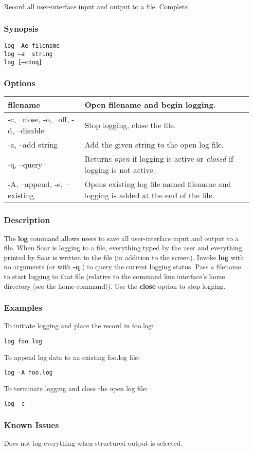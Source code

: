 \subsection{}
\label{log}
Record all user-interface input and output to a file. 
 Complete
\subsubsection*{Synopsis}
\begin{verbatim}
log –Ae filename
log –a  string
log [–cdoq]
\end{verbatim}
\subsubsection*{Options}
\begin{tabular}{|l|l|}
\hline 
 filename  & Open filename and begin logging.  \\
 \hline 
 -c, --close, -o, --off, -d, --disable  & Stop logging, close the file.  \\
 \hline 
 -a, --add string  & Add the given string to the open log file.  \\
 \hline 
 -q, --query  & Returns \emph{open}
 if logging is active or \emph{closed}
 if logging is not active.  \\
 \hline 
 -A, --append, -e, --existing  & Opens existing log file named filename and logging is added at the end of the file.  \\
 \hline 
\end{tabular}
\subsubsection*{Description}
 The \textbf{log}
 command allows users to save all user-interface input and output to a file. When Soar is logging to a file, everything typed by the user and everything printed by Soar is written to the file (in addition to the screen). 
 Invoke \textbf{log}
 with no arguments (or with \textbf{-q}
) to query the current logging status. Pass a filename to start logging to that file (relative to the command line interface's home directory (see the home command)). Use the \textbf{close}
 option to stop logging. 
\subsubsection*{Examples}
 To initiate logging and place the record in foo.log: \begin{verbatim}
log foo.log
\end{verbatim}
 To append log data to an existing foo.log file: \begin{verbatim}
log -A foo.log
\end{verbatim}
 To terminate logging and close the open log file: \begin{verbatim}
log -c
\end{verbatim}
\subsubsection*{Known Issues}
 Does not log everything when structured output is selected. 
